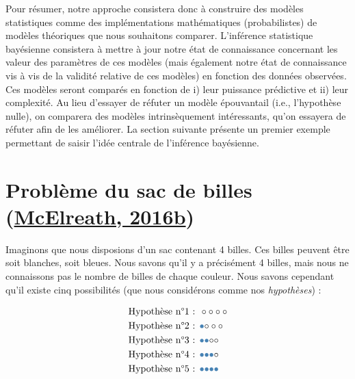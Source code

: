 \documentclass[
  a4paper,11pt,twoside,onecolumn,openright,final,oldfontcommands]{memoir}
\theoremstyle{definition}
\theoremstyle{definition}
\theoremstyle{definition}
\theoremstyle{remark}
\begin{document}
Pour résumer, notre approche consistera donc à construire des modèles statistiques comme des implémentations mathématiques (probabilistes) de modèles théoriques que nous souhaitons comparer. L'inférence statistique bayésienne consistera à mettre à jour notre état de connaissance concernant les valeur des paramètres de ces modèles (mais également notre état de connaissance vis à vis de la validité relative de ces modèles) en fonction des données observées. Ces modèles seront comparés en fonction de i) leur puissance prédictive et ii) leur complexité. Au lieu d'essayer de réfuter un modèle épouvantail (i.e., l'hypothèse nulle), on comparera des modèles intrinsèquement intéressants, qu'on essayera de réfuter afin de les améliorer. La section suivante présente un premier exemple permettant de saisir l'idée centrale de l'inférence bayésienne.

\hypertarget{probluxe8me-du-sac-de-billes-mcelreath_statistical_2016}{%
\section{\texorpdfstring{Problème du sac de billes (\protect\hyperlink{ref-mcelreath_statistical_2016}{McElreath, 2016b})}{Problème du sac de billes (McElreath, 2016b)}}\label{probluxe8me-du-sac-de-billes-mcelreath_statistical_2016}}

Imaginons que nous disposions d'un sac contenant 4 billes. Ces billes peuvent être soit blanches, soit bleues. Nous savons qu'il y a précisément 4 billes, mais nous ne connaissons pas le nombre de billes de chaque couleur. Nous savons cependant qu'il existe cinq possibilités (que nous considérons comme nos \emph{hypothèses}) :

\[
\begin{aligned}
&\text{Hypothèse n°1 : } \LARGE \circ \circ \circ \circ \\
&\text{Hypothèse n°2 : } \LARGE \color{steelblue}{\bullet} \color{black}{\circ} \circ \circ \\
&\text{Hypothèse n°3 : } \LARGE \color{steelblue}{\bullet} \color{steelblue}{\bullet} \color{black}{\circ} \circ \\
&\text{Hypothèse n°4 : } \LARGE \color{steelblue}{\bullet} \color{steelblue}{\bullet} \color{steelblue}{\bullet} \color{black}{\circ} \\
&\text{Hypothèse n°5 : } \LARGE \color{steelblue}{\bullet} \color{steelblue}{\bullet} \color{steelblue}{\bullet} \color{steelblue}{\bullet} \\
\end{aligned}
\]
\end{document}
